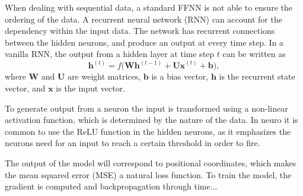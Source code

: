 When dealing with sequential data, a standard FFNN is not able to ensure the ordering of the data. A recurrent neural network (RNN) can account for the dependency within the input data. The network has recurrent connections between the hidden neurons, and produce an output at every time step. In a vanilla RNN, the output from a hidden layer at time step $t$ can be written as 
\begin{equation}
    \mathbf{h}^{(t)} = f \bigg( \mathbf{Wh}^{(t-1)} + \mathbf{Ux}^{(t)} +  \mathbf{b} \bigg), 
\end{equation}
where $\mathbf{W}$ and $\mathbf{U}$ are weight matrices, $\mathbf{b}$ is a bias vector, $\mathbf{h}$ is the recurrent state vector, and $\mathbf{x}$ is the input vector.

To generate output from a neuron the input is transformed using a non-linear activation function, which is determined by the nature of the data. In neuro it is common to use the ReLU function in the hidden neurons, as it emphasizes the neurons need for an input to reach a certain threshold in order to fire. 

The output of the model will correspond to positional coordinates, which makes the mean squared error (MSE) a natural loss function. To train the model, the gradient is computed and backpropagation through time...
